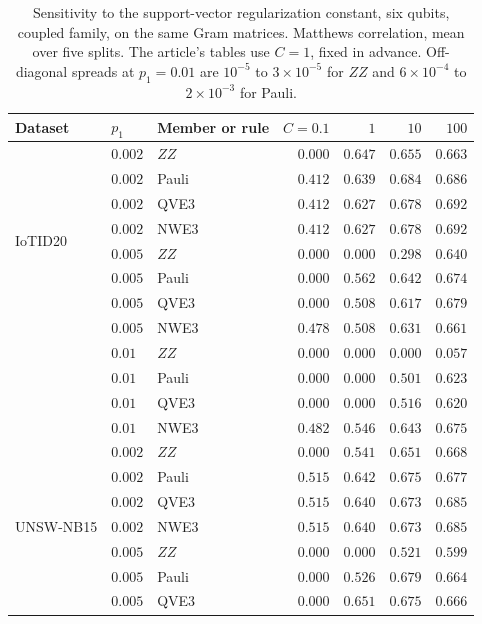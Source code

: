 \begin{table}[t]
\centering
\caption{Sensitivity to the support-vector regularization constant, six qubits, coupled
family, on the same Gram matrices. Matthews correlation, mean over five splits. The
article's tables use $C = 1$, fixed in advance. Off-diagonal spreads at $p_1 = 0.01$ are
$10^{-5}$ to $3\times10^{-5}$ for $ZZ$ and $6\times10^{-4}$ to $2\times10^{-3}$ for Pauli.}
\label{tab:csweep}
\begin{tabular}{@{}lllrrrr@{}}
\toprule
Dataset & $p_1$ & Member or rule & $C = 0.1$ & $1$ & $10$ & $100$ \\
\midrule
\multirow{8}{*}{IoTID20}
 & $0.002$ & $ZZ$ & $0.000$ & $0.647$ & $0.655$ & $0.663$ \\
 & $0.002$ & Pauli & $0.412$ & $0.639$ & $0.684$ & $0.686$ \\
 & $0.002$ & QVE3 & $0.412$ & $0.627$ & $0.678$ & $0.692$ \\
 & $0.002$ & NWE3 & $0.412$ & $0.627$ & $0.678$ & $0.692$ \\
 & $0.005$ & $ZZ$ & $0.000$ & $0.000$ & $0.298$ & $0.640$ \\
 & $0.005$ & Pauli & $0.000$ & $0.562$ & $0.642$ & $0.674$ \\
 & $0.005$ & QVE3 & $0.000$ & $0.508$ & $0.617$ & $0.679$ \\
 & $0.005$ & NWE3 & $0.478$ & $0.508$ & $0.631$ & $0.661$ \\
 & $0.01$ & $ZZ$ & $0.000$ & $0.000$ & $0.000$ & $0.057$ \\
 & $0.01$ & Pauli & $0.000$ & $0.000$ & $0.501$ & $0.623$ \\
 & $0.01$ & QVE3 & $0.000$ & $0.000$ & $0.516$ & $0.620$ \\
 & $0.01$ & NWE3 & $0.482$ & $0.546$ & $0.643$ & $0.675$ \\
\midrule
\multirow{8}{*}{UNSW-NB15}
 & $0.002$ & $ZZ$ & $0.000$ & $0.541$ & $0.651$ & $0.668$ \\
 & $0.002$ & Pauli & $0.515$ & $0.642$ & $0.675$ & $0.677$ \\
 & $0.002$ & QVE3 & $0.515$ & $0.640$ & $0.673$ & $0.685$ \\
 & $0.002$ & NWE3 & $0.515$ & $0.640$ & $0.673$ & $0.685$ \\
 & $0.005$ & $ZZ$ & $0.000$ & $0.000$ & $0.521$ & $0.599$ \\
 & $0.005$ & Pauli & $0.000$ & $0.526$ & $0.679$ & $0.664$ \\
 & $0.005$ & QVE3 & $0.000$ & $0.651$ & $0.675$ & $0.666$ \\

\end{tabular}
\end{table}
